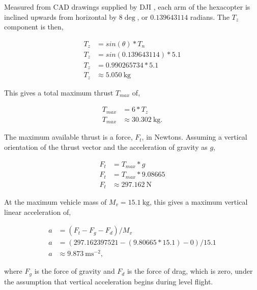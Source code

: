 \documentclass[doc]{apa6}
\begin{document}
Measured from CAD drawings supplied by DJI \parencite{DJI2017}, each arm of the hexacopter is inclined upwards from horizontal by $8\deg$, or $0.139643114$ radians. The $T_z$ component is then,

\begin{equation}
\begin{split}
T_z &= sin(\theta) * T_n \\
T_z &= sin(0.139643114) * 5.1 \\
T_z &= 0.990265734 * 5.1 \\
T_z &\approx \SI{5.050}{\kg} %
\end{split}
\end{equation}

This gives a total maximum thrust $T_{max}$ of,

\begin{equation}
\begin{split}
T_{max} &= 6 * T_z \\
T_{max} &\approx \SI{30.302}{\kg}.
\end{split}
\end{equation} 

The maximum available thrust is a force, $F_t$, in Newtons. Assuming a vertical orientation of the thrust vector and the acceleration of gravity as $g$, 

\begin{equation}
\begin{split}
F_t &= T_{max} * g \\
F_t &= T_{max} * 9.08665 \\
F_t &\approx \SI{297.162}{\N}
\end{split}
\end{equation}

At the maximum vehicle mass of $M_v = \SI{15.1}{\kg}$, this gives a maximum vertical linear acceleration of,

\begin{equation}
\begin{split}
a &= (F_t - F_g - F_d) / M_v \\
a &= (297.162397521 - (9.80665 * 15.1) - 0) / 15.1 \\
a &\approx \SI{9.873}{\m\s^{-2}}, %
\end{split}
\end{equation}

where $F_g$ is the force of gravity and $F_d$ is the force of drag, which is zero, under the assumption that vertical acceleration begins during level flight.
\end{document}
